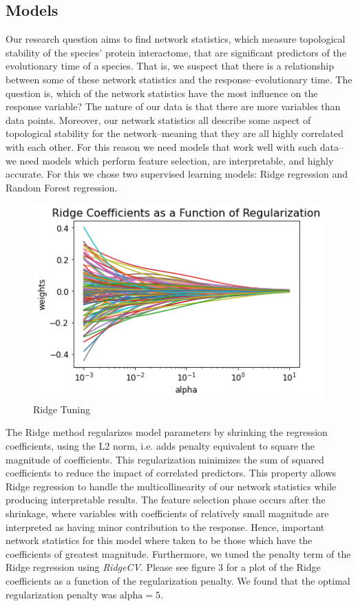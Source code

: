 \documentclass[12pt]{article}
\begin{document}
\subsection{Models}
Our research question aims to find network statistics, which measure topological stability of the species’ protein interactome, that are significant predictors of the evolutionary time of a species. That is, we suspect that there is a relationship between some of these network statistics and the response--evolutionary time. The question is, which of the network statistics have the most influence on the response variable? The nature of our data is that there are more variables than data points. Moreover, our network statistics all describe some aspect of topological stability for the network--meaning that they are all highly correlated with each other. For this reason we need models that work well with such data--we need models which perform feature selection, are interpretable, and highly accurate. For this we chose two supervised learning models: Ridge regression and Random Forest regression. 

\begin{figure}
\centering
  \includegraphics[width=.4\linewidth]{PPIN_fig4}
  \caption{Ridge Tuning}
  \label{fig:PPIN_fig4}
\end{figure}

The Ridge method regularizes model parameters by shrinking the regression coefficients, using the L2 norm, i.e. adds penalty equivalent to square the magnitude of coefficients. This regularization minimizes the sum of squared coefficients to reduce the impact of correlated predictors. This property allows Ridge regression to handle the multicollinearity of our network statistics while producing interpretable results. The feature selection phase occurs after the shrinkage, where variables with coefficients of relatively small magnitude are interpreted as having minor contribution to the response. Hence, important network statistics for this model where taken to be those which have the coefficients of greatest magnitude. Furthermore, we tuned the penalty term of the Ridge regression using \textit{RidgeCV}. Please see figure 3 for a plot of the Ridge coefficients as a function of the regularization penalty. We found that the optimal regularization penalty was $\text{alpha} = 5$. 
\end{document}
